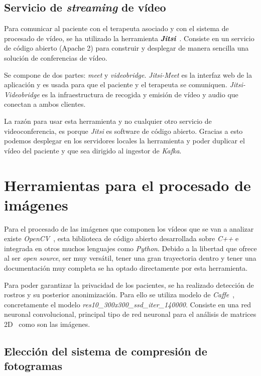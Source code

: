 \subsection{Servicio de \textit{streaming} de vídeo}

Para comunicar al paciente con el terapeuta asociado y con el sistema de procesado de vídeo, se ha utilizado la herramienta \textit{\textbf{Jitsi}}~\cite{tool:jitsi}. Consiste en un servicio de código abierto (Apache 2) para construir y desplegar de manera sencilla una solución de conferencias de vídeo.

Se compone de dos partes: \textit{meet} y \textit{videobridge}. \textit{Jitsi-Meet} es la interfaz web de la aplicación y es usada para que el paciente y el terapeuta se comuniquen. \textit{Jitsi-Videobridge} es la infraestructura de recogida y emisión de vídeo y audio que conectan a ambos clientes.

La razón para usar esta herramienta y no cualquier otro servicio de videoconferencia, es porque \textit{Jitsi} es software de código abierto. Gracias a esto podemos desplegar en los servidores locales la herramienta y poder duplicar el vídeo del paciente y que sea dirigido al ingestor de \textit{Kafka}.

\section{Herramientas para el procesado de imágenes}

Para el procesado de las imágenes que componen los vídeos que se van a analizar existe \textit{OpenCV}~\cite{opencv_library}, esta biblioteca de código abierto desarrollada sobre \textit{C++} e integrada en otros muchos lenguajes como \textit{Python}. Debido a la libertad que ofrece al ser \textit{open source}, ser muy versátil, tener una gran trayectoria dentro  y tener una documentación muy completa se ha optado directamente por esta herramienta.

Para poder garantizar la privacidad de los pacientes, se ha realizado detección de rostros y su posterior anonimización. Para ello se utiliza modelo de \textit{Caffe}~\cite{jia2014caffe}, concretamente el modelo \textit{res10\_300x300\_ssd\_iter\_140000}. Consiste en una red neuronal convolucional, principal tipo de red neuronal para el análisis de matrices 2D~\cite{lawrence1997face} como son las imágenes.


\subsection{Elección del sistema de compresión de fotogramas}\label{sec:sistemacompresion}

